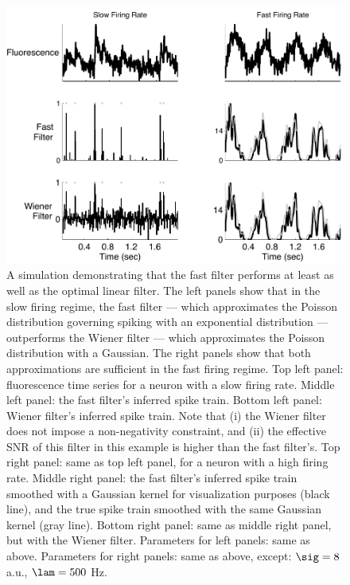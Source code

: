 \newpage \begin{figure}[H]
\centering \includegraphics[width=.9\linewidth]{../figs/wiener}
\caption{A simulation demonstrating that the fast filter performs at least as well as the optimal linear filter. The left panels show that in the slow firing  regime, the fast filter --- which approximates the Poisson distribution governing spiking with an exponential distribution  --- outperforms the Wiener filter --- which approximates the Poisson distribution with a Gaussian.  The right panels show that both approximations are sufficient in the fast firing regime. Top left panel: fluorescence time series for a neuron with a slow firing rate.  Middle left panel: the fast filter's inferred spike train.  Bottom left panel: Wiener filter's inferred spike train.  Note that (i) the Wiener filter does not impose a non-negativity constraint, and (ii) the effective SNR of this filter in this example is higher than the fast filter's.  Top right panel: same as top left panel, for a neuron with a high firing rate.  Middle right panel: the fast filter's inferred spike train smoothed with a Gaussian kernel for visualization purposes (black line), and the true spike train smoothed with the same Gaussian kernel (gray line).  Bottom right panel: same as middle right panel, but with the Wiener filter. Parameters for left panels: same as above.  Parameters for right panels: same as above, except: $\sig=8$ a.u., $\lam=500$ Hz.} \label{fig:wiener}
\end{figure}



